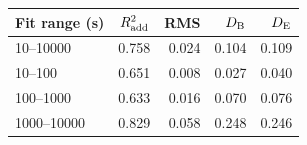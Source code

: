 \begin{tabular}{@{}lrrrr@{}}
\toprule
Fit range (s) & $R^2_{\rm add}$ & RMS & $D_{\rm B}$ & $D_{\rm E}$ \\
\midrule
10--10000 & 0.758 & 0.024 & 0.104 & 0.109 \\
10--100 & 0.651 & 0.008 & 0.027 & 0.040 \\
100--1000 & 0.633 & 0.016 & 0.070 & 0.076 \\
1000--10000 & 0.829 & 0.058 & 0.248 & 0.246 \\
\bottomrule
\end{tabular}
